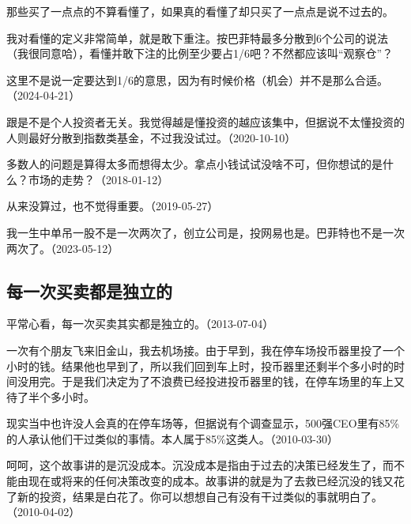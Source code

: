 那些买了一点点的不算看懂了，如果真的看懂了却只买了一点点是说不过去的。

我对看懂的定义非常简单，就是敢下重注。按巴菲特最多分散到6个公司的说法（我很同意哈），看懂并敢下注的比例至少要占1/6吧？不然都应该叫“观察仓”？

这里不是说一定要达到1/6的意思，因为有时候价格（机会）并不是那么合适。（2024-04-21）


跟是不是个人投资者无关。我觉得越是懂投资的越应该集中，但据说不太懂投资的人则最好分散到指数类基金，不过我没试过。（2020-10-10）


多数人的问题是算得太多而想得太少。拿点小钱试试没啥不可，但你想试的是什么？市场的走势？（2018-01-12）


从来没算过，也不觉得重要。（2019-05-27）

我一生中单吊一股不是一次两次了，创立公司是，投网易也是。巴菲特也不是一次两次了。（2023-05-12）

\subsection{每一次买卖都是独立的}

平常心看，每一次买卖其实都是独立的。（2013-07-04）

一次有个朋友飞来旧金山，我去机场接。由于早到，我在停车场投币器里投了一个小时的钱。结果他也早到了，所以我们回到车上时，投币器里还剩半个多小时的时间没用完。于是我们决定为了不浪费已经投进投币器里的钱，在停车场里的车上又待了半个多小时。

现实当中也许没人会真的在停车场等，但据说有个调查显示，500强CEO里有85\%的人承认他们干过类似的事情。本人属于85\%这类人。（2010-03-30）

呵呵，这个故事讲的是沉没成本。沉没成本是指由于过去的决策已经发生了，而不能由现在或将来的任何决策改变的成本。故事讲的就是为了去救已经沉没的钱又花了新的投资，结果是白花了。你可以想想自己有没有干过类似的事就明白了。（2010-04-02）


